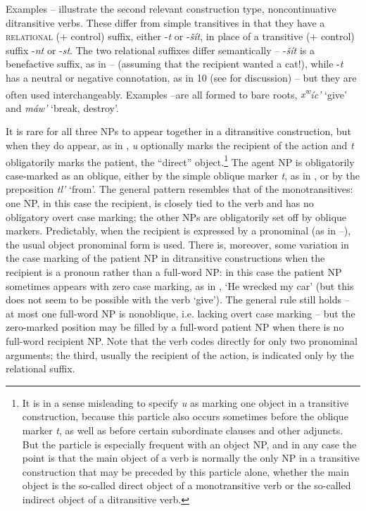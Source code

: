 \documentclass[output=paper,colorlinks,citecolor=brown]{langscibook}
\begin{document}
Examples -- illustrate the second relevant construction type,
noncontinuative ditransitive verbs.  These differ from simple
transitives in that they have a \textsc{relational} (+ control) suffix,
either -\emph{{\textltilde}t} or -\emph{\v{s}\'it}, in place of a
transitive (+ control) suffix -\emph{nt} or -\emph{st}.  The two
relational suffixes differ semantically -- -\emph{\v{s}\'it} is a
benefactive suffix, as in -- (assuming that the recipient wanted a
cat!), while -\emph{{\textltilde}t} has a neutral or negative
connotation, as in 10 (see \citealt{Carlson:1980} for discussion) -- but they
are often used interchangeably.  Examples --are all formed to bare
roots, \emph{{x\textsuperscript w}\'ic'} `give' and \emph{m\'aw'}
`break, destroy'.


  It is rare for all three NPs to appear together in a ditransitive
  construction, but when they do appear, as in , \emph{{\textltilde}u} optionally marks the recipient of the action and
  \emph{t} obligatorily marks the patient, the ``direct''
  object.\footnote{It is in a sense misleading to specify \emph{{\textltilde}u} as marking one object in a transitive
  construction, because this particle also occurs sometimes before
  the oblique marker \emph{t}, as well as before certain subordinate
  clauses and other adjuncts.  But the particle is especially
  frequent with an object NP, and in any case the point is that the
  main object of a verb is normally the only NP in a transitive
  construction that may be preceded by this particle alone, whether
  the main object is the so-called direct object of a monotransitive
  verb or the so-called indirect object of a ditransitive verb.  }
  The agent NP is obligatorily case-marked as an oblique, either by
  the simple oblique marker \emph{t}, as in , or by the preposition
  \emph{tl'} `from'.  The general pattern resembles that of the
  monotransitives: one NP, in this case the recipient, is closely
  tied to the verb and has no obligatory overt case marking; the
  other NPs are obligatorily set off by oblique markers.
  Predictably, when the recipient is expressed by a pronominal (as in
  --), the usual object pronominal form is used.  There is,
  moreover, some variation in the case marking of the patient NP in
  ditransitive constructions when the recipient is a pronoun rather
  than a full-word NP: in this case the patient NP sometimes appears
  with zero case marking, as in , `He wrecked my car' (but this
  does not seem to be possible with the verb `give').  The general
  rule still holds -- at most one full-word NP is nonoblique, i.e.
  lacking overt case marking -- but the zero-marked position may be
  filled by a full-word patient NP when there is no full-word
  recipient NP.  Note that the verb codes directly for only two
  pronominal arguments; the third, usually the recipient of the
  action, is indicated only by the relational suffix.
\end{document}
